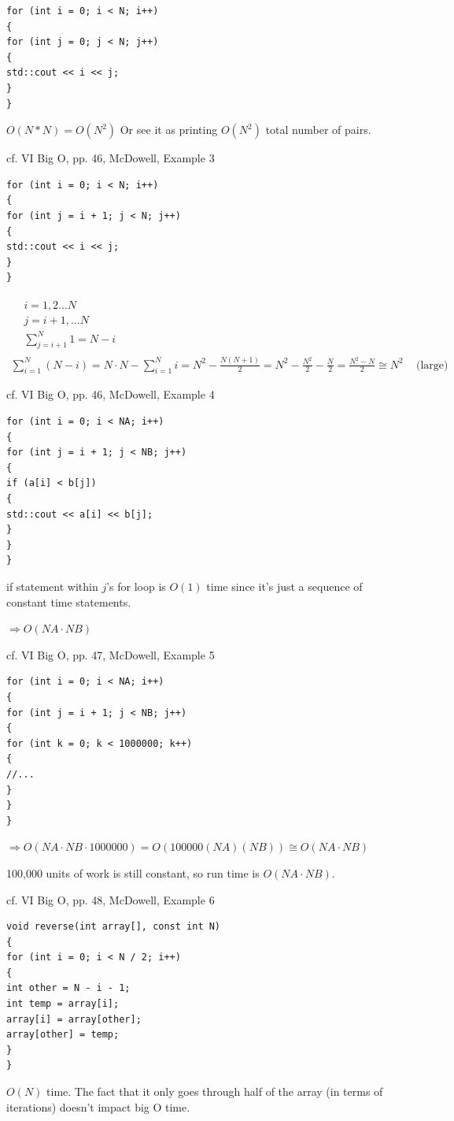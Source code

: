 \documentclass[10pt]{amsart}
\begin{document}
\begin{verbatim}
for (int i = 0; i < N; i++)
{
for (int j = 0; j < N; j++)
{
std::cout << i << j;
}
}
\end{verbatim}

$O(N*N)= O(N^2)$ Or see it as printing $O(N^2)$ total number of pairs.

cf. VI Big O, pp. 46, McDowell, Example 3
\begin{verbatim}
for (int i = 0; i < N; i++)
{
for (int j = i + 1; j < N; j++)
{
std::cout << i << j;
}
}
\end{verbatim}
\[
\begin{gathered}
\begin{aligned}
& i = 1, 2 \dots N \\
& j = i+1, \dots N \\
& \sum_{j=i+1}^N 1 = N-i 
\end{aligned} \\
\sum_{i=1}^N (N-i) = N\cdot N  - \sum_{i=1}^N i = N^2 - \frac{N(N+1)}{2} = N^2 - \frac{N^2}{2} - \frac{N}{2} = \frac{N^2 - N}{2} \cong N^2 \quad \, \text{(large)}
\end{gathered}
\]

cf. VI Big O, pp. 46, McDowell, Example 4
\begin{verbatim}
for (int i = 0; i < NA; i++)
{
for (int j = i + 1; j < NB; j++)
{
if (a[i] < b[j])
{
std::cout << a[i] << b[j];
}
}
}
\end{verbatim}
if statement within $j$'s for loop is $O(1)$ time since it's just a sequence of constant time statements.

$\Longrightarrow O(NA \cdot NB)$

cf. VI Big O, pp. 47, McDowell, Example 5

\begin{verbatim}
for (int i = 0; i < NA; i++)
{
for (int j = i + 1; j < NB; j++)
{
for (int k = 0; k < 1000000; k++) 
{
//...
}
}
}
\end{verbatim}

$\Longrightarrow O(NA \cdot NB \cdot 1000000) = O(100000 (NA)(NB)) \cong O(NA\cdot NB)$

100,000 units of work is still constant, so run time is $O(NA\cdot NB)$.

cf. VI Big O, pp. 48, McDowell, Example 6

\begin{verbatim}
void reverse(int array[], const int N)
{
for (int i = 0; i < N / 2; i++)
{
int other = N - i - 1;
int temp = array[i];
array[i] = array[other];
array[other] = temp;
}
}
\end{verbatim}
$O(N)$ time. The fact that it only goes through half of the array (in terms of iterations) doesn't impact big O time.
\end{document}
